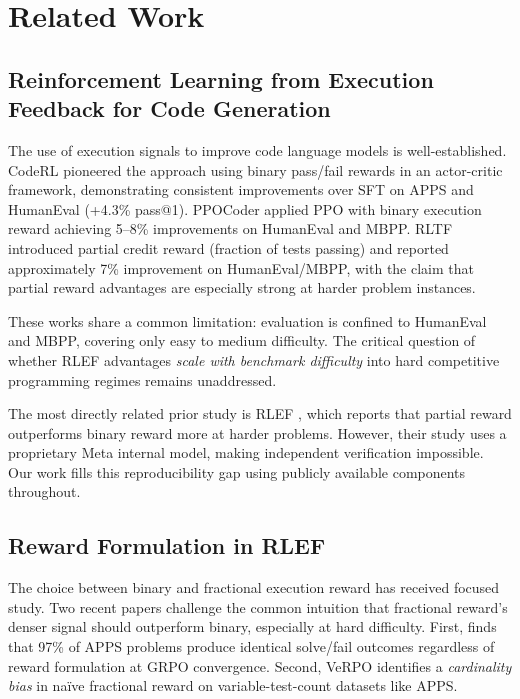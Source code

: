 \section{Related Work}

\subsection{Reinforcement Learning from Execution Feedback for Code Generation}

The use of execution signals to improve code language models is well-established. CodeRL \cite{Le2022CodeRL} pioneered the approach using binary pass/fail rewards in an actor-critic framework, demonstrating consistent improvements over SFT on APPS and HumanEval (+4.3\% pass@1). PPOCoder \cite{Majeed2023PPOCoder} applied PPO with binary execution reward achieving 5--8\% improvements on HumanEval and MBPP. RLTF \cite{Liu2023RLTF} introduced partial credit reward (fraction of tests passing) and reported approximately 7\% improvement on HumanEval/MBPP, with the claim that partial reward advantages are especially strong at harder problem instances.

These works share a common limitation: evaluation is confined to HumanEval and MBPP, covering only easy to medium difficulty. The critical question of whether RLEF advantages \textit{scale with benchmark difficulty} into hard competitive programming regimes remains unaddressed.

The most directly related prior study is RLEF \cite{Gehring2024RLEF}, which reports that partial reward outperforms binary reward more at harder problems. However, their study uses a proprietary Meta internal model, making independent verification impossible. Our work fills this reproducibility gap using publicly available components throughout.

\subsection{Reward Formulation in RLEF}

The choice between binary and fractional execution reward has received focused study. Two recent papers challenge the common intuition that fractional reward's denser signal should outperform binary, especially at hard difficulty. First, \cite{Anonymous2025PassRate} finds that 97\% of APPS problems produce identical solve/fail outcomes regardless of reward formulation at GRPO convergence. Second, VeRPO \cite{Anonymous2025VeRPO} identifies a \textit{cardinality bias} in na\"{i}ve fractional reward on variable-test-count datasets like APPS.

